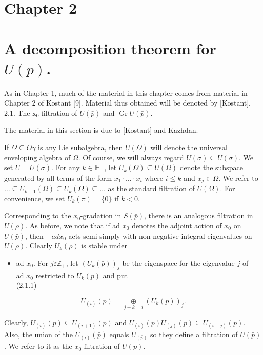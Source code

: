 \documentclass[10pt]{article}
\begin{document}
\section{Chapter 2}
\section{A decomposition theorem for $U(\bar{p})$.}
As in Chapter 1, much of the material in this chapter comes from material in Chapter 2 of Kostant [9]. Material thus obtained will be denoted by [Kostant].\\
2.1. The $\mathrm{x}_{0}$-filtration of $U(\bar{p})$ and $\operatorname{Gr} U(\bar{p})$.

The material in this section is due to [Kostant] and Kazhdan.

If $\Omega \subseteq O \gamma$ is any Lie subalgebra, then $U(\Omega)$ will denote the universal enveloping algebra of $\Omega$. Of course, we will always regard $U(\sigma) \subseteq U(\sigma)$. We set $U=U(\sigma)$. For any $k \in \mathbb{H}_{+}$, let $U_{k}(\Omega) \subseteq U(\Omega)$ denote the subspace generated by all terms of the form $x_{1} \cdot \ldots \cdot x_{i}$ where $i \leq k$ and $x_{j} \in \Omega$. We refer to $\ldots \subseteq U_{k-1}(\Omega) \subseteq U_{k}(\Omega) \subseteq \ldots$ as the standard filtration of $U(\Omega)$. For convenience, we set $U_{k}(\pi)=\{0\}$ if $k<0$.

Corresponding to the $x_{0}$-gradation in $S(\bar{p})$, there is an analogous filtration in $U(\bar{\rho})$. As before, we note that if ad $x_{0}$ denotes the adjoint action of $x_{0}$ on $U(\bar{p})$, then $-a d x_{0}$ acts semi-simply with non-negative integral eigenvalues on $U(\bar{\rho})$. Clearly $U_{k}(\bar{\rho})$ is stable under

\begin{itemize}
  \item ad $x_{0}$. For $j \varepsilon \mathbb{Z}_{+}$, let $\left(U_{k}(\bar{p})\right)_{j}$ be the eigenspace for the eigenvalue $j$ of - ad $x_{0}$ restricted to $U_{k}(\bar{p})$ and put\\
(2.1.1)
\end{itemize}

$$
U_{(i)}(\bar{p})=\underset{j+k=i}{\oplus}\left(U_{k}(\bar{p})\right)_{j} .
$$

Clearly, $U_{(i)}(\bar{p}) \subseteq U_{(i+1)}(\bar{p})$ and $U_{(i)}(\bar{p}) U_{(j)}(\bar{p}) \subseteq U_{(i+j)}(\bar{p})$. Also, the union of the $U_{(i)}(\bar{p})$ equals $U_{(\bar{p})}$ so they define a filtration of $U(\bar{p})$. We refer to it as the $x_{0}$-filtration of $U(\bar{p})$.
\end{document}
